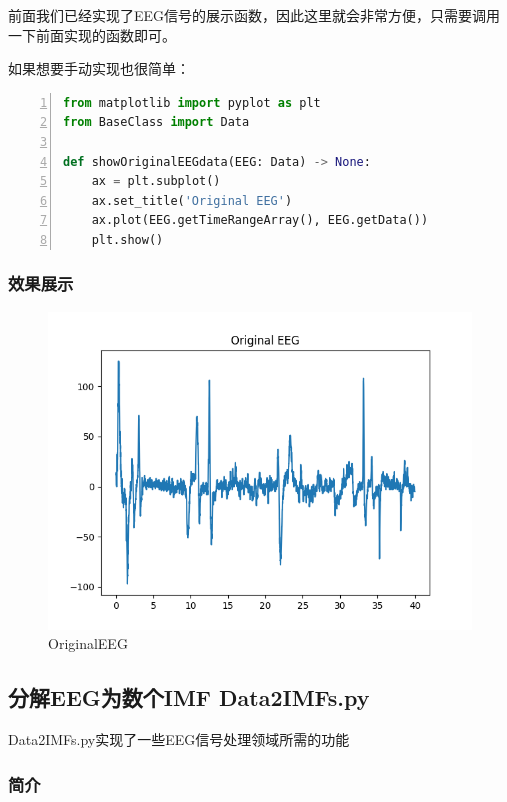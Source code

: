 \documentclass[cs4size,a4paper]{ctexart}
\numberwithin{equation}{section}
\numberwithin{table}{section}
\numberwithin{figure}{section}
\begin{document}
前面我们已经实现了EEG信号的展示函数，因此这里就会非常方便，只需要调用一下前面实现的函数即可。

如果想要手动实现也很简单：

\begin{lstlisting}[language={python},
numbers=left,
numberstyle=\tiny\monaco,
basicstyle=\footnotesize\monaco]
from matplotlib import pyplot as plt
from BaseClass import Data

def showOriginalEEGdata(EEG: Data) -> None:
    ax = plt.subplot()
    ax.set_title('Original EEG')
    ax.plot(EEG.getTimeRangeArray(), EEG.getData())
    plt.show()
\end{lstlisting}

\subsubsection{效果展示}

\begin{figure}[H]
\small
\centering
\includegraphics{OriginalEEG.png}
\caption{OriginalEEG} \label{fig:OriginalEEG}
\end{figure}

\subsection{分解EEG为数个IMF Data2IMFs.py}

\colorbox{LetMeFlyGray}{Data2IMFs.py}实现了一些EEG信号处理领域所需的功能

\subsubsection{简介}
\end{document}
